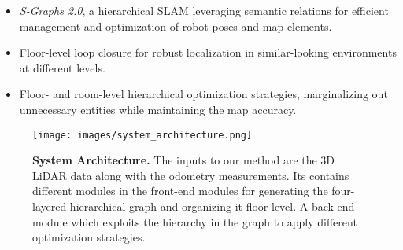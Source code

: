 \begin{itemize}
    \item \textit{S-Graphs 2.0}, a hierarchical SLAM leveraging semantic relations for efficient management and optimization of robot poses and map elements.
    \item Floor-level loop closure for robust localization in similar-looking environments at different levels. 
    \item Floor- and room-level hierarchical optimization strategies, marginalizing out unnecessary entities while maintaining the map accuracy.
\end{itemize}





\begin{figure*}[t]
  \centering
  \texttt{[image: images/system\_architecture.png]}
  \caption{\textbf{System Architecture.} The inputs to our method are the 3D LiDAR data along with the odometry measurements. Its contains different modules in the front-end modules for generating the four-layered hierarchical graph and organizing it floor-level. A back-end module which exploits the hierarchy in the graph to apply different optimization strategies.}
  \label{fig:system_architecture}
\end{figure*}

